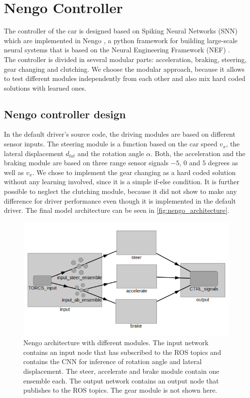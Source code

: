 \documentclass[10pt,a4paper,twoside,journal]{IEEEtran}
\begin{document}
\section{Nengo Controller}
\label{sc:controller}
The controller of the car is designed based on Spiking Neural Networks (SNN) which are implemented in Nengo \cite{nengo}, a python framework for building large-scale neural systems that is based on the Neural Engineering Framework (NEF) \cite{nef}. \\
The controller is divided in several modular parts: acceleration, braking, steering, gear changing and clutching. We choose the modular approach, because it allows to test different modules independently from each other and also mix hard coded solutions with learned ones.

\subsection{Nengo controller design}
In the default driver's source code, the driving modules are based on different sensor inputs. The steering module is a function based on the car speed $v_x$, the lateral displacement $d_{lat}$ and the rotation angle $\alpha$. Both, the acceleration and the braking module are based on three range sensor signals $-5$, $0$ and $5$ degrees as well as $v_x$. We chose to implement the gear changing as a hard coded solution without any learning involved, since it is a simple if-else condition. It is further possible to neglect the clutching module, because it did not show to make any difference for driver performance even though it is implemented in the default driver. The final model architecture can be seen in \autoref{fig:nengo_architecture}.\\
\begin{figure}[ht]
	\centering
	\includegraphics[width=\columnwidth]{attachments/nengo_architecture.png}
	\caption{Nengo architecture with different modules. The input network contains an input node that has subscribed to the ROS topics and contains the CNN for inference of rotation angle and lateral displacement. The steer, accelerate and brake module contain one ensemble each. The output network contains an output node that publishes to the ROS topics. The gear module is not shown here.}
	\label{fig:nengo_architecture}
\end{figure}
\end{document}
